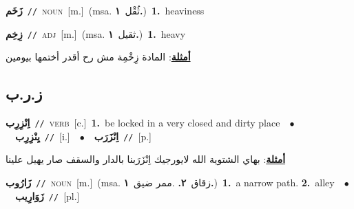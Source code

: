 \documentclass[10pt,a4paper,twoside]{article} %
\begin{document}
\begin{multicols}{2}
{{{{{{{{{{{{\setlength\topsep{0pt}\textbf{\foreignlanguage{arabic}{زَخَم}}\ {\color{gray}\texttt{//}\color{black}}\ \textsc{noun}\ [m.]\ \color{gray}(msa. \foreignlanguage{arabic}{ثُقْل}~\foreignlanguage{arabic}{\textbf{١.}})\color{black}\ \textbf{1.}~heaviness\ 

{\setlength\topsep{0pt}\textbf{\foreignlanguage{arabic}{زِخِم}}\ {\color{gray}\texttt{//}\color{black}}\ \textsc{adj}\ [m.]\ \color{gray}(msa. \foreignlanguage{arabic}{ثقيل}~\foreignlanguage{arabic}{\textbf{١.}})\color{black}\ \textbf{1.}~heavy\  \begin{flushright}\color{gray}\foreignlanguage{arabic}{\textbf{\underline{\foreignlanguage{arabic}{أمثلة}}}: المادة زِخْمِة مش رح أقدر أختمها بيومين}\end{flushright}\color{black}} \vspace{2mm}

\vspace{-3mm}
\subsection*{\color{blue}\foreignlanguage{arabic}{ز.ر.ب}\color{blue}{}} 

{\setlength\topsep{0pt}\textbf{\foreignlanguage{arabic}{اِنْزِرِب}}\ {\color{gray}\texttt{//}\color{black}}\ \textsc{verb}\ [c.]\ \textbf{1.}~be locked in a very closed and dirty place\ \ $\bullet$\ \ \setlength\topsep{0pt}\textbf{\foreignlanguage{arabic}{يِنْزِرِب}}\ {\color{gray}\texttt{//}\color{black}}\ [i.]\ \ $\bullet$\ \ \setlength\topsep{0pt}\textbf{\foreignlanguage{arabic}{اِنْزَرَب}}\ {\color{gray}\texttt{//}\color{black}}\ [p.]\  \begin{flushright}\color{gray}\foreignlanguage{arabic}{\textbf{\underline{\foreignlanguage{arabic}{أمثلة}}}: بهاي الشتوية الله لايورجيك اِنْزَرَبنا بالدار والسقف صار يهيل علينا}\end{flushright}\color{black}} \vspace{2mm}

{\setlength\topsep{0pt}\textbf{\foreignlanguage{arabic}{زَارُوب}}\ {\color{gray}\texttt{//}\color{black}}\ \textsc{noun}\ [m.]\ \color{gray}(msa. \foreignlanguage{arabic}{زقاق}~\foreignlanguage{arabic}{\textbf{٢.}}  .\foreignlanguage{arabic}{ممر ضيق}~\foreignlanguage{arabic}{\textbf{١.}})\color{black}\ \textbf{1.}~a narrow path.  \textbf{2.}~alley\ \ $\bullet$\ \ \setlength\topsep{0pt}\textbf{\foreignlanguage{arabic}{زَوَارِيب}}\ {\color{gray}\texttt{//}\color{black}}\ [pl.]\ 

}}}}}}}}}}}}}
\end{multicols}
\end{document}
